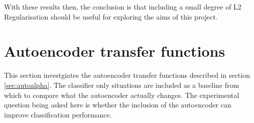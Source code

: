         With these results then, the conclusion is that including a small degree of L2
        Regularisation should be useful for exploring the aims of this project.


        \section{Autoencoder transfer functions}
        This section investgiates the autoencoder transfer functions described in section \ref{sec:autoalpha}.
        The classifier only situations are included as a baseline from which to compare
        what the autoencoder actually changes. The experimental question being asked here
        is whether the inclusion of the autoencoder can improve classification performance.



